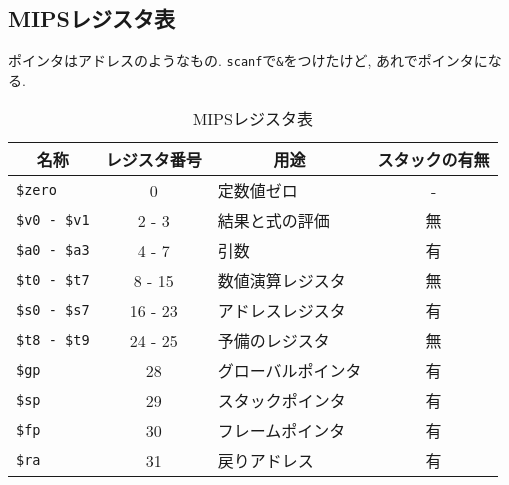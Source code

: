 \documentclass[a4paper, xelatex, ja=standard]{bxjsarticle}
\begin{document}
\subsection{MIPSレジスタ表}
ポインタはアドレスのようなもの. \texttt{scanf}で\texttt{\&}をつけたけど, あれでポインタになる.
\begin{table}[h]
  \centering
  \caption{MIPSレジスタ表}
  \label{}
  \begin{tabular}{|l|c|l|c|}\hline
\multicolumn{1}{|c|}{名称} & レジスタ番号  & \multicolumn{1}{c|}{用途} & スタックの有無 \\ \hline
\texttt{\$zero}      & 0       & 定数値ゼロ         & -  \\ \hline
\texttt{\$v0 - \$v1} & 2 - 3   & 結果と式の評価     & 無 \\ \hline
\texttt{\$a0 - \$a3} & 4 - 7   & 引数               & 有 \\ \hline
\texttt{\$t0 - \$t7} & 8 - 15  & 数値演算レジスタ   & 無 \\ \hline
\texttt{\$s0 - \$s7} & 16 - 23 & アドレスレジスタ   & 有 \\ \hline
\texttt{\$t8 - \$t9} & 24 - 25 & 予備のレジスタ     & 無 \\ \hline
\texttt{\$gp}        & 28      & グローバルポインタ & 有 \\ \hline
\texttt{\$sp}        & 29      & スタックポインタ   & 有 \\ \hline
\texttt{\$fp}        & 30      & フレームポインタ   & 有 \\ \hline
\texttt{\$ra}        & 31      & 戻りアドレス       & 有 \\ \hline
\end{tabular}
\end{table}
\end{document}
